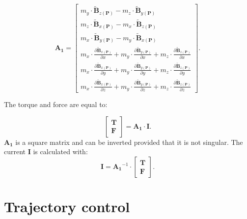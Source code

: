 \begin{equation}
\mathbf{A_1}=\begin{bmatrix}
m_y\cdot \mathbf{\widetilde{B}}_{z(\mathbf{P})}-m_z\cdot \mathbf{\widetilde{B}}_{y(\mathbf{P})}
\\
m_z\cdot \mathbf{\widetilde{B}}_{x(\mathbf{P})}-m_x\cdot \mathbf{\widetilde{B}}_{z(\mathbf{P})}
\\ 
m_x\cdot \mathbf{\widetilde{B}}_{y(\mathbf{P})}-m_y\cdot \mathbf{\widetilde{B}}_{x(\mathbf{P})}
\\
m_x\cdot\frac{{\partial {\mathbf{\widetilde{B}}}_{x(\mathbf{P})}}}{\partial x}+m_y\cdot\frac{{\partial {\mathbf{\widetilde{B}}}_{y(\mathbf{P})}}}{\partial x}+m_z\cdot\frac{{\partial {\mathbf{\widetilde{B}}}_{z(\mathbf{P})}}}{\partial x}
\\ 
m_x\cdot\frac{{\partial {\mathbf{\widetilde{B}}}_{x(\mathbf{P})}}}{\partial y}+m_y\cdot\frac{{\partial {\mathbf{\widetilde{B}}}_{y(\mathbf{P})}}}{\partial y}+m_z\cdot\frac{{\partial {\mathbf{\widetilde{B}}}_{z(\mathbf{P})}}}{\partial y}
\\ 
m_x\cdot\frac{{\partial {\mathbf{\widetilde{B}}}_{x(\mathbf{P})}}}{\partial z}+m_y\cdot\frac{{\partial {\mathbf{\widetilde{B}}}_{y(\mathbf{P})}}}{\partial z}+m_z\cdot\frac{{\partial {\mathbf{\widetilde{B}}}_{z(\mathbf{P})}}}{\partial z}
\end{bmatrix}.
\label{A1}
\end{equation}

The torque and force are equal to:

\begin{equation}
\label{FullEq2}
\begin{bmatrix}
\mathbf{T}
\\ 
\mathbf{F}
\end{bmatrix}=\mathbf{A_1}\cdot\mathbf{I}.
\end{equation}
$\mathbf{A_1}$ is a square matrix and can be inverted provided that it is not singular. The current $\mathbf{I}$ is calculated with:
\begin{equation}
\mathbf{I}=\mathbf{A_1}^{-1}\cdot\begin{bmatrix}
\mathbf{T}
\\ 
\mathbf{F}
\end{bmatrix}.
\label{FullEq3}
\end{equation}


\section{Trajectory control}\label{sec:TrajectoryControl}


